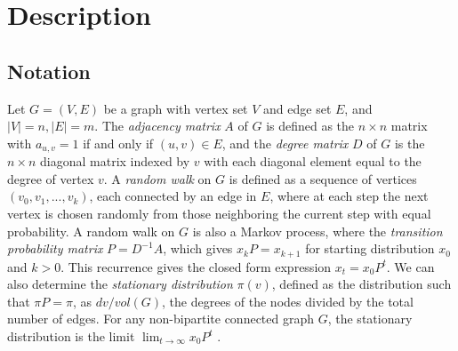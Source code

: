 \documentclass{article} %
\begin{document}



\section{Description}

\subsection{Notation}

Let $G = (V,E)$ be a graph with vertex set $V$ and edge set $E$, and $|V| = n, |E| = m$. The \emph{adjacency matrix} $A$ of $G$ is defined as the $n\times n$ matrix with $a_{u,v} = 1$ if and only if $(u,v)\in E$, and the \emph{degree matrix} $D$ of $G$ is the $n \times n$ diagonal matrix indexed by $v$ with each diagonal element equal to the degree of vertex $v$. A \emph{random walk} on $G$ is defined as a sequence of vertices $(v_0,v_1,...,v_k)$, each connected by an edge in $E$, where at each step the next vertex is chosen randomly from those neighboring the current step with equal probability. A random walk on $G$ is also a Markov process, where the \emph{transition probability matrix} $P = D^{-1}A$, which gives $x_kP = x_{k+1}$ for starting distribution $x_0$ and $k>0$. This recurrence gives the closed form expression $x_t = x_0P^t$. We can also determine the \emph{stationary distribution} $\pi(v)$, defined as the distribution such that $\pi P = \pi$, as $dv/vol(G)$, the degrees of the nodes divided by the total number of edges. For any non-bipartite connected graph $G$, the stationary distribution is the limit $\displaystyle\lim_{t\rightarrow\infty}{x_0P^t}$ \cite{Lovasz}.
\end{document}
